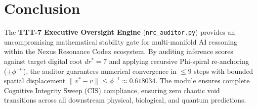 \section{Conclusion}
The \textbf{TTT-7 Executive Oversight Engine} (\texttt{nrc\_auditor.py}) provides an uncompromising mathematical stability gate for multi-manifold AI reasoning within the Nexus Resonance Codex ecosystem. By auditing inference scores against target digital root $dr^* = 7$ and applying recursive Phi-spiral re-anchoring ($\pm \phi^{-n}$), the auditor guarantees numerical convergence in $\le 9$ steps with bounded spatial displacement $\|v^* - v\| \le \phi^{-1} \approx 0.618034$. The module ensures complete Cognitive Integrity Sweep (CIS) compliance, ensuring zero chaotic void transitions across all downstream physical, biological, and quantum predictions.
